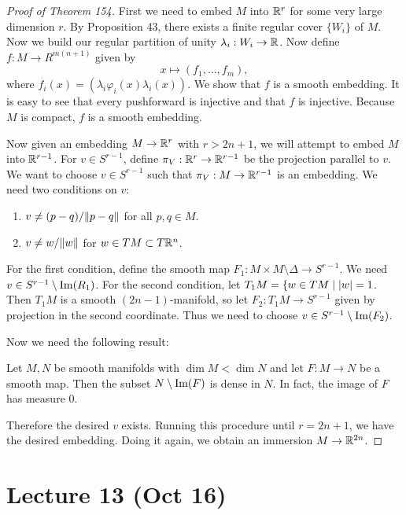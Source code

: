 \documentclass[twoside, 10pt]{article}
\begin{document}
    \begin{proof}[Proof of Theorem 154] First we need to embed $M$ into $\mathbb{R}^r$
        for some very large dimension $r$. By Proposition 43, there exists a
        finite regular cover $\{W_i \}$ of $M$. Now we build our regular
        partition of unity $\lambda_i: W_i \to \mathbb{R}$. Now define $f:M \to
        R^{m(n+1)}$ given by \[ x \mapsto (f_1, \ldots, f_m), \] where $f_i(x)
        = (\lambda_i \varphi_i(x) \lambda_i(x))$. We show that $f$ is a smooth
        embedding. It is easy to see that every pushforward is injective and
        that $f$ is injective. Because $M$ is compact, $f$ is a smooth
        embedding.

        Now given an embedding $M \to \mathbb{R}^r$ with $r>2n+1$, we will attempt to
        embed $M$ into $\mathbb{R}^{r-1}$. For $v \in S^{r-1}$, define $\pi_V: \mathbb{R}^r \to
        \mathbb{R}^{r-1}$ be the projection parallel to $v$. We want to choose $v \in
        S^{r-1}$ such that $\pi_V:M \to \mathbb{R}^{r-1}$ is an embedding. We need two
        conditions on $v$: \begin{enumerate} \item $v \neq (p-q)/\lVert p-q\rVert$
        for all $p,q \in M$.  \item $v \neq w/\lVert w\rVert$ for $w \in TM \subset
T\mathbb{R}^n$.  \end{enumerate} For the first condition, define the smooth map $F_1:M
\times M \setminus \Delta \to S^{r-1}$. We need $v \in S^{r-1} \setminus
\mathrm{Im}(R_1)$. For the second condition, let $T_1M = \{w \in TM \mid \lvert w\rvert =
    1$. Then $T_1M$ is a smooth $(2n-1)$-manifold, so let $F_2: T_1M \to
    S^{r-1}$ given by projection in the second coordinate. Thus we need to
    choose $v \in S^{r-1} \setminus \mathrm{Im}(F_2)$.
        
        Now we need the following result:

        \begin{thm} Let $M,N$ be smooth manifolds with $\dim M < \dim N$ and
        let $F:M \to N$ be a smooth map. Then the subset $N \setminus
    \mathrm{Im}(F)$ is dense in $N$. In fact, the image of $F$ has measure $0$.
\end{thm}

        Therefore the desired $v$ exists. Running this procedure until $r =
    2n+1$, we have the desired embedding. Doing it again, we obtain an
immersion $M \to \mathbb{R}^{2n}$.  \end{proof}

    \section{Lecture 13 (Oct 16)}%
    
\end{document}
